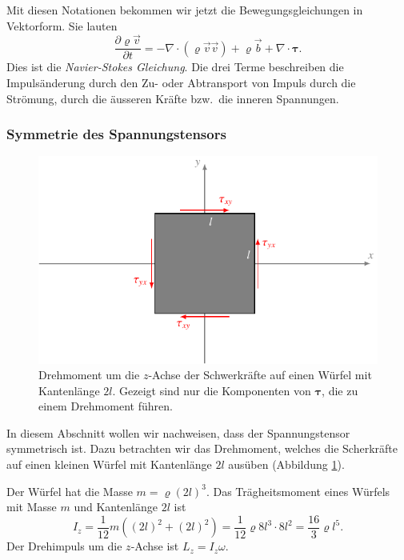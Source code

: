 Mit diesen Notationen bekommen wir jetzt die Bewegungsgleichungen in
Vektorform.
Sie lauten
\begin{equation}
\frac{\partial \varrho\vec v}{\partial t}
=
-\nabla\cdot(\varrho\vec{v}\vec{v})
+ \varrho\vec{b}
+ \nabla\cdot \bm{\tau}.
\label{skript:navier-stokes1}
\end{equation}
Dies ist die {\em Navier-Stokes Gleichung}.
Die drei Terme beschreiben die Impulsänderung durch den Zu- oder Abtransport
von Impuls durch die Strömung, durch die äusseren Kräfte bzw.~die inneren
Spannungen.

\subsubsection{Symmetrie des Spannungstensors}
\label{skript:spannungstensor symmetrisch}
\begin{figure}
\centering
\includegraphics{chapters/2/drehmoment.pdf}
\caption{Drehmoment um die $z$-Achse der Schwerkräfte auf einen Würfel
mit Kantenlänge $2l$. Gezeigt sind nur die Komponenten von $\bm{\tau}$,
die zu einem Drehmoment führen.
\label{skript:drehmoment}}
\end{figure}
In diesem Abschnitt wollen wir nachweisen, dass der Spannungstensor
symmetrisch ist.
Dazu betrachten wir das Drehmoment, welches die Scherkräfte auf einen
kleinen Würfel mit Kantenlänge $2l$ ausüben (Abbildung \ref{skript:drehmoment}).

Der Würfel hat die Masse $m=\varrho(2l)^3$.
Das Trägheitsmoment eines Würfels mit Masse $m$ und Kantenlänge $2l$
ist
\[
I_z
=
\frac1{12}m((2l)^2+(2l)^2)
=
\frac1{12}\varrho 8l^3\cdot8l^2
=
\frac{16}{3}\varrho l^5.
\]
Der Drehimpuls um die $z$-Achse ist $L_z=I_z\omega$.

